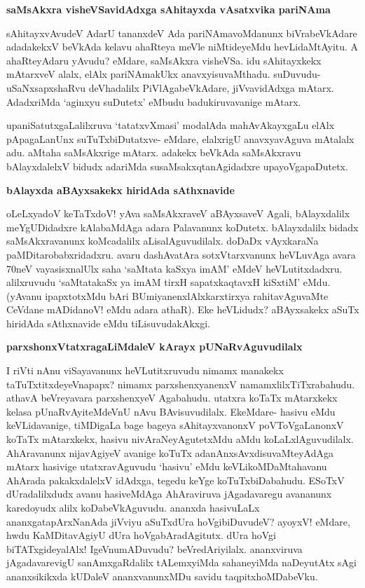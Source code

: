 {\bf saMsAkxra visheVSavidAdxga sAhitayxda vAsatxvika pariNAma}

sAhitayxvAvudeV AdarU tananxdeV Ada pariNAmavoMdanunx biVrabeVkAdare adadakekxV beVkAda kelavu ahaRteya meVle niMtideyeMdu hevLidaMtAyitu. A ahaRteyAdaru yAvudu? eMdare, saMsAkxra visheVSa. idu sAhitayxkekx mAtarxveV alalx, elAlx pariNAmakUkx anavxyisuvaMthadu. suDuvudu- uSaNxsapxshaRvu deVhadalilx PiVlAgabeVkAdare, jiVvavidAdxga mAtarx. AdadxriMda `aginxyu suDutetx' eMbudu badukiruvavanige mAtarx.

upaniSatutxgaLalilxruva `tatatxvXmasi' modalAda mahAvAkayxgaLu elAlx pApagaLanUnx suTuTxbiDutatxve- eMdare, elalxrigU anavxyavAguva mAtalalx adu. aMtaha saMsAkxrige mAtarx. adakekx beVkAda saMsAkxravu bAlayxdalelxV bidudx adariMda susaMsakxqtanAgidadxre upayoVgapaDutetx.

{\bf bAlayxda aBAyxsakekx hiridAda sAthxnavide}

oLeLxyadoV keTaTxdoV! yAva saMsAkxraveV aBAyxsaveV Agali, bAlayxdalilx meYgUDidadxre kAlabaMdAga adara Palavanunx koDutetx. bAlayxdalilx bidadx saMsAkxravanunx koMcadalilx aLisalAguvudilalx. doDaDx vAyxkaraNa paMDitarobabxridadxru. avaru dashAvatAra sotxVtarxvanunx heVLuvAga avara 70neV vayasisxnalUlx saha `saMtata kaSxya imAM' eMdeV heVLutitxdadxru. alilxruvudu `saMtatakaSx ya imAM tirxH sapatxkaqtavxH kiSxtiM' eMdu. (yAvanu ipapxtotxMdu bAri BUmiyanenxlAlxkarxtirxya rahitavAguvaMte CeVdane mADidanoV! eMdu adara athaR). Eke heVLidudx? aBAyxsakekx aSuTx hiridAda sAthxnavide eMdu tiLisuvudakAkxgi.

{\bf parxshonxVtatxragaLiMdaleV kArayx pUNaRvAguvudilalx}

I riVti nAnu viSayavanunx heVLutitxruvudu nimamx manakekx taTuTxtitxdeyeVnapapx? nimamx parxshenxyanenxV namamxlilxTiTxrabahudu. athavA beVreyavara parxshenxyeV Agabahudu. utatxra koTaTx mAtarxkekx kelasa pUnaRvAyiteMdeVnU nAvu BAvisuvudilalx. EkeMdare- hasivu eMdu keVLidavanige, tiMDigaLa bage bageya sAhitayxvanonxV poVToVgaLanonxV koTaTx mAtarxkekx, hasivu nivAraNeyAgutetxMdu aMdu koLaLxlAguvudilalx. AhAravanunx nijavAgiyeV avanige koTuTx adanAnxsAvxdisuvaMteyAdAga mAtarx hasivige utatxravAguvudu `hasivu' eMdu keVLikoMDaMtahavanu AhArada pakakxdalelxV idAdxga, tegedu keYge koTuTxbiDabahudu. ESoTxV dUradalilxdudx avanu hasiveMdAga AhAraviruva jAgadavaregu avananunx karedoyudx alilx koDabeVkAguvudu. ananxda hasivuLaLx ananxgatapArxNanAda jiVviyu aSuTxdUra hoVgibiDuvudeV? ayoyxV! eMdare, hwdu KaMDitavAgiyU dUra hoVgabAradAgitutx. dUra hoVgi biTATxgideyalAlx! IgeVnumADuvudu? beVredAriyilalx. ananxviruva jAgadavarevigU sanAmxgaRdalilx tALemxyiMda sahaneyiMda naDeyutAtx sAgi ananxsikikxda kUDaleV ananxvanunxMDu savidu taqpitxhoMDabeVku.

